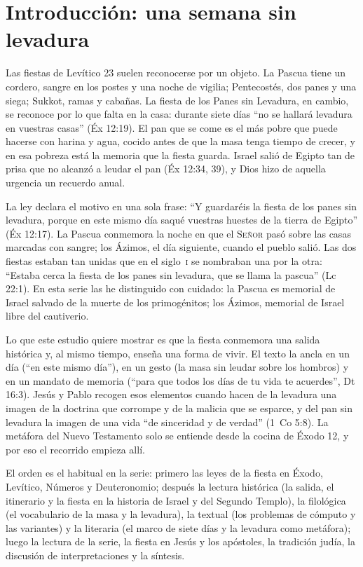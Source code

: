 \documentclass[11pt,letterpaper]{article}
\newcommand{\SENOR}{\textsc{Señor}}
\begin{document}
\section{Introducción: una semana sin levadura}

Las fiestas de Levítico 23 suelen reconocerse por un objeto. La Pascua tiene un cordero, sangre en los postes y una noche de vigilia; Pentecostés, dos panes y una siega; Sukkot, ramas y cabañas. La fiesta de los Panes sin Levadura, en cambio, se reconoce por lo que falta en la casa: durante siete días ``no se hallará levadura en vuestras casas'' (Éx 12:19). El pan que se come es el más pobre que puede hacerse con harina y agua, cocido antes de que la masa tenga tiempo de crecer, y en esa pobreza está la memoria que la fiesta guarda. Israel salió de Egipto tan de prisa que no alcanzó a leudar el pan (Éx 12:34, 39), y Dios hizo de aquella urgencia un recuerdo anual.

La ley declara el motivo en una sola frase: ``Y guardaréis la fiesta de los panes sin levadura, porque en este mismo día saqué vuestras huestes de la tierra de Egipto'' (Éx 12:17). La Pascua conmemora la noche en que el \SENOR{} pasó sobre las casas marcadas con sangre; los Ázimos, el día siguiente, cuando el pueblo salió. Las dos fiestas estaban tan unidas que en el siglo~\textsc{i} se nombraban una por la otra: ``Estaba cerca la fiesta de los panes sin levadura, que se llama la pascua'' (Lc 22:1). En esta serie las he distinguido con cuidado: la Pascua es memorial de Israel salvado de la muerte de los primogénitos; los Ázimos, memorial de Israel libre del cautiverio.

Lo que este estudio quiere mostrar es que la fiesta conmemora una salida histórica y, al mismo tiempo, enseña una forma de vivir. El texto la ancla en un día (``en este mismo día''), en un gesto (la masa sin leudar sobre los hombros) y en un mandato de memoria (``para que todos los días de tu vida te acuerdes'', Dt 16:3). Jesús y Pablo recogen esos elementos cuando hacen de la levadura una imagen de la doctrina que corrompe y de la malicia que se esparce, y del pan sin levadura la imagen de una vida ``de sinceridad y de verdad'' (1~Co 5:8). La metáfora del Nuevo Testamento solo se entiende desde la cocina de Éxodo 12, y por eso el recorrido empieza allí.

El orden es el habitual en la serie: primero las leyes de la fiesta en Éxodo, Levítico, Números y Deuteronomio; después la lectura histórica (la salida, el itinerario y la fiesta en la historia de Israel y del Segundo Templo), la filológica (el vocabulario de la masa y la levadura), la textual (los problemas de cómputo y las variantes) y la literaria (el marco de siete días y la levadura como metáfora); luego la lectura de la serie, la fiesta en Jesús y los apóstoles, la tradición judía, la discusión de interpretaciones y la síntesis.
\end{document}
